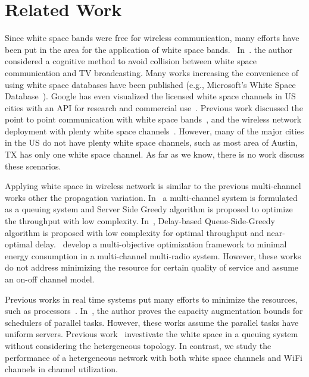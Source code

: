 \section{Related Work}
\label{sec:related}


Since white space bands were free for wireless communication, many efforts have been 
put in the area for the application of white space bands.~\cite{fccwhitespace} 
In~\cite{bahl2009white}. the author considered a cognitive method to avoid collision 
between white space communication and TV broadcasting. 
Many works increasing the convenience of using white space databases have been published 
(e.g., Microsoft's White Space Database~\cite{msdatabase}).
Google has even visualized the licensed white space channels 
in US cities with an API for research and commercial use~\cite{googledatabase}.
Previous work discussed the point to point communication with white space bands~\cite{cui2013leveraging}, 
and the wireless network deployment with plenty white space channels~\cite{pcuiwinmee}.
However, many of the major cities in the US do not have plenty white space channels, such as 
most area of Austin, TX has only one white space channel. As far as we know, there is no work 
discuss these scenarios.


Applying white space in wireless network is similar to the previous multi-channel works other the 
propagation variation. In~\cite{bodas2012low} a multi-channel system is formulated as a queuing 
system and Server Side Greedy algorithm is proposed to optimize the throughput with low complexity. 
In~\cite{ji2013performance}, Delay-based Queue-Side-Greedy algorithm is proposed with low complexity 
for optimal throughput and near-optimal delay.~\cite{liu2014energy} develop a multi-objective optimization 
framework to minimal energy consumption in a multi-channel multi-radio system. 
However, these works do not address minimizing the resource for certain quality of service and assume an 
on-off channel model.

Previous works in real time systems put many efforts to minimize the resources, such as processors~\cite{nelissen2012techniques}.
In~\cite{li2014analysis}, the author proves the capacity augmentation bounds for schedulers of parallel tasks. 
However, these works assume the parallel tasks have uniform servers. 
Previous work~\cite{chen2011feasibility} investivate the white space in a queuing system without considering the 
hetergeneous topology.
In contrast, we study the performance of a hetergeneous network with both white space channels 
and WiFi channels in channel utilization. 






